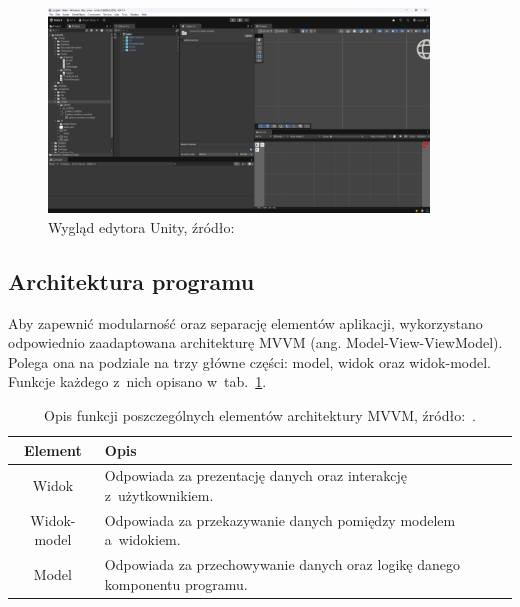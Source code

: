 \begin{figure}[h]
    \centering
    \includegraphics[width=0.9\textwidth]{chapters/chapter3/rys/unity_editor}
    \caption[Widok okna edytora Unity]{Wygląd edytora Unity, źródło: \cite{unity_site}}
    \label{fig:unity_editor}
\end{figure}



\subsection{Architektura programu}
\label{subsec:architektura_programu}

Aby zapewnić modularność oraz separację elementów aplikacji,
wykorzystano odpowiednio zaadaptowana architekturę MVVM (ang. Model-View-ViewModel).
Polega ona na podziale na trzy główne części: model, widok oraz widok-model.
Funkcje każdego z~nich opisano w~tab.~\ref{tab:mvvm}.

\begin{table}[h]
    \centering
    \caption[Opis funkcji poszczególnych elementów architektury MVVM.]
    {Opis funkcji poszczególnych elementów architektury MVVM, źródło:~\cite{mvvm}.}
    \label{tab:mvvm}
    \begin{tabular}{|c|p{}|}
        \hline
        Element & Opis \\
        \hline
        \hline
        Widok & Odpowiada za prezentację danych oraz interakcję z~użytkownikiem. \\
        \hline
        Widok-model & Odpowiada za przekazywanie danych pomiędzy modelem a~widokiem. \\
        \hline
        Model & Odpowiada za przechowywanie danych oraz logikę danego komponentu programu. \\
        \hline
    \end{tabular}
\end{table}

